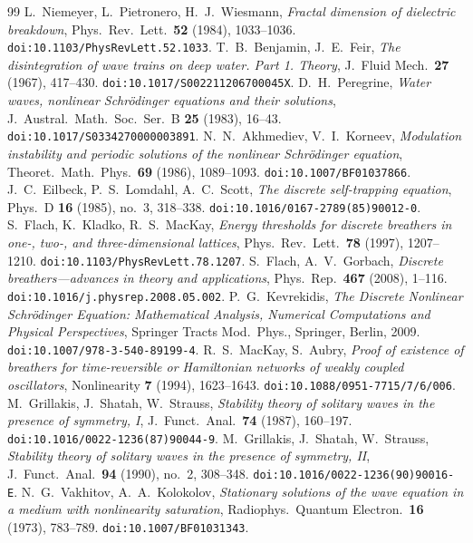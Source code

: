 \documentclass[11pt,reqno]{amsart}
\theoremstyle{plain}
\theoremstyle{definition}
\begin{document}
\begin{thebibliography}{99}
 L.~Niemeyer, L.~Pietronero, H.~J.~Wiesmann, \emph{Fractal dimension of dielectric breakdown}, Phys.\ Rev.\ Lett.\ \textbf{52} (1984), 1033--1036. \texttt{doi:10.1103/PhysRevLett.52.1033}.
 T.~B.~Benjamin, J.~E.~Feir, \emph{The disintegration of wave trains on deep water. Part 1. Theory}, J.~Fluid Mech.\ \textbf{27} (1967), 417--430. \texttt{doi:10.1017/S002211206700045X}.
 D.~H.~Peregrine, \emph{Water waves, nonlinear Schr\"odinger equations and their solutions}, J.~Austral.\ Math.\ Soc.\ Ser.~B \textbf{25} (1983), 16--43. \texttt{doi:10.1017/S0334270000003891}.
 N.~N.~Akhmediev, V.~I.~Korneev, \emph{Modulation instability and periodic solutions of the nonlinear Schr\"odinger equation}, Theoret.\ Math.\ Phys.\ \textbf{69} (1986), 1089--1093. \texttt{doi:10.1007/BF01037866}.
 J.~C.~Eilbeck, P.~S.~Lomdahl, A.~C.~Scott, \emph{The discrete self-trapping equation}, Phys.\ D \textbf{16} (1985), no.~3, 318--338. \texttt{doi:10.1016/0167-2789(85)90012-0}.
 S.~Flach, K.~Kladko, R.~S.~MacKay, \emph{Energy thresholds for discrete breathers in one-, two-, and three-dimensional lattices}, Phys.\ Rev.\ Lett.\ \textbf{78} (1997), 1207--1210. \texttt{doi:10.1103/PhysRevLett.78.1207}.
 S.~Flach, A.~V.~Gorbach, \emph{Discrete breathers---advances in theory and applications}, Phys.\ Rep.\ \textbf{467} (2008), 1--116. \texttt{doi:10.1016/j.physrep.2008.05.002}.
 P.~G.~Kevrekidis, \emph{The Discrete Nonlinear Schr\"odinger Equation: Mathematical Analysis, Numerical Computations and Physical Perspectives}, Springer Tracts Mod.\ Phys., Springer, Berlin, 2009. \texttt{doi:10.1007/978-3-540-89199-4}.
 R.~S.~MacKay, S.~Aubry, \emph{Proof of existence of breathers for time-reversible or Hamiltonian networks of weakly coupled oscillators}, Nonlinearity \textbf{7} (1994), 1623--1643. \texttt{doi:10.1088/0951-7715/7/6/006}.
 M.~Grillakis, J.~Shatah, W.~Strauss, \emph{Stability theory of solitary waves in the presence of symmetry, I}, J.\ Funct.\ Anal.\ \textbf{74} (1987), 160--197. \texttt{doi:10.1016/0022-1236(87)90044-9}.
 M.~Grillakis, J.~Shatah, W.~Strauss, \emph{Stability theory of solitary waves in the presence of symmetry, II}, J.\ Funct.\ Anal.\ \textbf{94} (1990), no.~2, 308--348. \texttt{doi:10.1016/0022-1236(90)90016-E}.
 N.~G.~Vakhitov, A.~A.~Kolokolov, \emph{Stationary solutions of the wave equation in a medium with nonlinearity saturation}, Radiophys.\ Quantum Electron.\ \textbf{16} (1973), 783--789. \texttt{doi:10.1007/BF01031343}.

\end{thebibliography}
\end{document}
